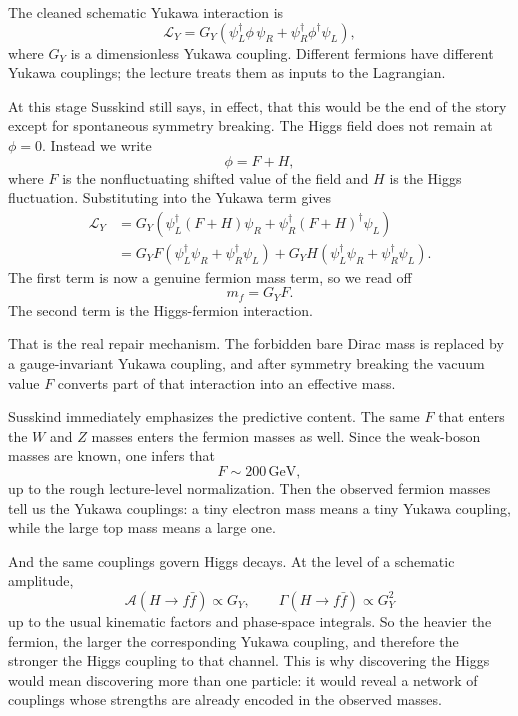 The cleaned schematic Yukawa interaction is
\begin{equation}
\mathcal{L}_Y
=
G_Y\left(\psi_L^\dagger \phi\,\psi_R+\psi_R^\dagger \phi^\dagger \psi_L\right),
\end{equation}
where \(G_Y\) is a dimensionless Yukawa coupling. Different fermions have different Yukawa couplings; the lecture treats them as inputs to the Lagrangian.

At this stage Susskind still says, in effect, that this would be the end of the story except for spontaneous symmetry breaking. The Higgs field does not remain at \(\phi=0\). Instead we write
\begin{equation}
\phi = F + H,
\end{equation}
where \(F\) is the nonfluctuating shifted value of the field and \(H\) is the Higgs fluctuation. Substituting into the Yukawa term gives
\begin{align}
\mathcal{L}_Y
&=
G_Y\left(\psi_L^\dagger(F+H)\psi_R+\psi_R^\dagger(F+H)^\dagger\psi_L\right) \\
&=
G_YF\left(\psi_L^\dagger\psi_R+\psi_R^\dagger\psi_L\right)
+
G_YH\left(\psi_L^\dagger\psi_R+\psi_R^\dagger\psi_L\right).
\end{align}
The first term is now a genuine fermion mass term, so we read off
\begin{equation}
m_f = G_YF.
\end{equation}
The second term is the Higgs-fermion interaction.

That is the real repair mechanism. The forbidden bare Dirac mass is replaced by a gauge-invariant Yukawa coupling, and after symmetry breaking the vacuum value \(F\) converts part of that interaction into an effective mass.

Susskind immediately emphasizes the predictive content. The same \(F\) that enters the \(W\) and \(Z\) masses enters the fermion masses as well. Since the weak-boson masses are known, one infers that
\begin{equation}
F \sim 200\,\mathrm{GeV},
\end{equation}
up to the rough lecture-level normalization. Then the observed fermion masses tell us the Yukawa couplings: a tiny electron mass means a tiny Yukawa coupling, while the large top mass means a large one.

And the same couplings govern Higgs decays. At the level of a schematic amplitude,
\begin{equation}
\mathcal{A}(H\to f\bar f)\propto G_Y,
\qquad
\Gamma(H\to f\bar f)\propto G_Y^2
\end{equation}
up to the usual kinematic factors and phase-space integrals. So the heavier the fermion, the larger the corresponding Yukawa coupling, and therefore the stronger the Higgs coupling to that channel. This is why discovering the Higgs would mean discovering more than one particle: it would reveal a network of couplings whose strengths are already encoded in the observed masses.

